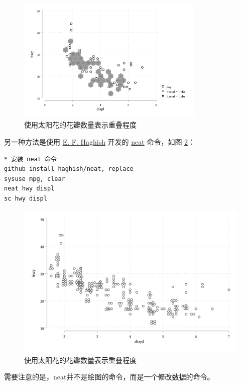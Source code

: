 \begin{figure}[htbp]
  \centering \includegraphics[width=0.8\textwidth]{assets/sunflower.png}
  \caption{使用太阳花的花瓣数量表示重叠程度}\label{fig:sunflower}
\end{figure}

另一种方法是使用 \href{https://github.com/haghish}{E. F. Haghish} 开发的 \href{https://github.com/haghish/neat}{neat} 命令，如图 \ref{fig:neatscatter}：

\begin{lstlisting}
* 安装 neat 命令
github install haghish/neat, replace
sysuse mpg, clear
neat hwy displ
sc hwy displ
\end{lstlisting}

\begin{figure}[htbp]
  \centering
  \includegraphics[width=\textwidth]{assets/neatscatter.png}
  \caption{使用太阳花的花瓣数量表示重叠程度}\label{fig:neatscatter}
\end{figure}

需要注意的是，neat并不是绘图的命令，而是一个修改数据的命令。

